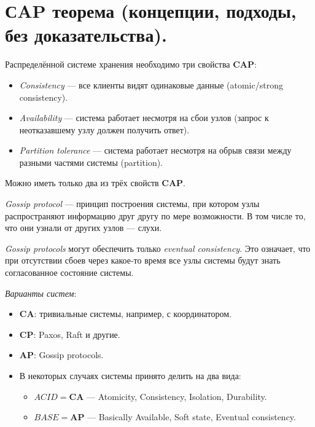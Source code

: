 \section{СAP теорема (концепции, подходы, без доказательства).}

\begin{definition}
    Распределённой системе хранения необходимо
    три свойства \textbf{CAP}:

    \begin{itemize}
        \item \textit{Consistency} --- все клиенты видят одинаковые данные
            (atomic/strong consistency).
        \item \textit{Availability} --- система работает несмотря на сбои узлов
            (запрос к неотказавшему узлу должен получить ответ).
        \item \textit{Partition tolerance} --- система работает несмотря на обрыв
            связи между разными частями системы (partition).
    \end{itemize}
\end{definition}

\begin{theorem}
    Можно иметь только два из трёх свойств \textbf{CAP}.
\end{theorem}

\begin{definition}
    \textit{Gossip protocol} --- принцип построения системы, при котором
    узлы распространяют информацию друг другу по мере возможности.
    В том числе то, что они узнали от других узлов --- слухи.
\end{definition}

\begin{remark}
    \textit{Gossip protocols} могут обеспечить только \textit{eventual consistency}.
    Это означает, что при отсутствии сбоев через какое-то время все узлы системы
    будут знать согласованное состояние системы.
\end{remark}

\begin{examples} \textit{Варианты систем}:
    \begin{itemize}
        \item \textbf{CA}: тривиальные системы, например, с координатором.
        \item \textbf{CP}: Paxos, Raft и другие.
        \item \textbf{AP}: Gossip protocols.
        \item В некоторых случаях системы принято делить на два вида:
            \begin{itemize}
                \item $ACID = \textbf{CA}$ --- Atomicity, Consistency,
                    Isolation, Durability.
                \item $BASE = \textbf{AP}$ --- Basically Available, Soft state,
                    Eventual consistency.
            \end{itemize}
    \end{itemize}
\end{examples}

